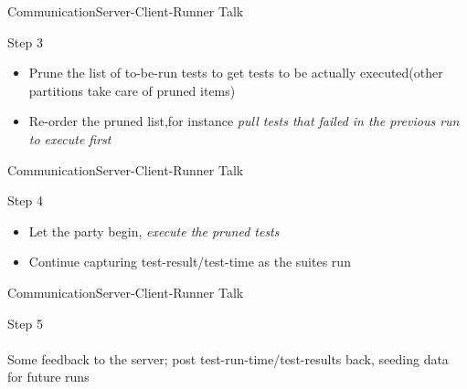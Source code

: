 \documentclass{beamer}
\begin{document}
\begin{frame}{Communication}{Server-Client-Runner Talk}
  \begin{multicols}{2}
    \begin{centering}
    \end{centering}
    \begin{center}
      {\huge Step 3}\\
      \begin{itemize}
          \item {\large Prune the list of to-be-run tests to get tests to be actually executed(other partitions take care of pruned items)}
          \item {\large Re-order the pruned list,for instance \emph{pull tests that failed in the previous run to execute first}}
      \end{itemize}
    \end{center}
  \end{multicols}
\end{frame}

\begin{frame}{Communication}{Server-Client-Runner Talk}
  \begin{multicols}{2}
    \begin{centering}
    \end{centering}
    \begin{center}
      {\huge Step 4}\\
          \begin{itemize}
          \item {\large Let the party begin, \emph{execute the pruned tests}}
          \item {\large Continue capturing test-result/test-time as the suites run}
          \end{itemize}
    \end{center}
  \end{multicols}
\end{frame}

\begin{frame}{Communication}{Server-Client-Runner Talk}
  \begin{multicols}{2}
    \begin{centering}
    \end{centering}
    \begin{center}
      {\huge Step 5}\\
      \quad\\
          {\large Some feedback to the server; post test-run-time/test-results back, seeding data for future runs}
    \end{center}
  \end{multicols}
\end{frame}
\end{document}
